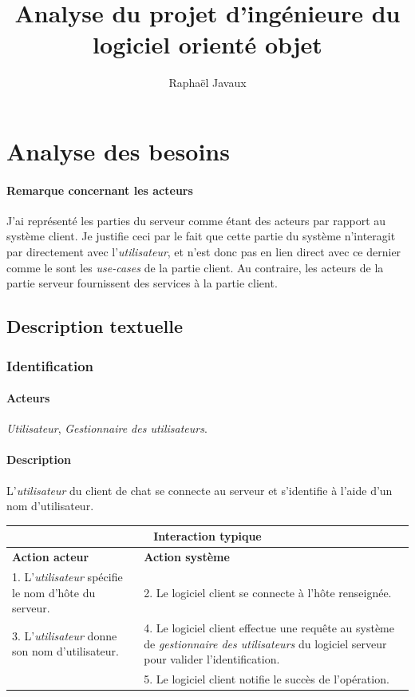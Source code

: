 \documentclass[a4paper]{article}
\title{Analyse du projet d’ingénieure du logiciel orienté objet}
\author{Raphaël Javaux}
\date{}
\begin{document}
\maketitle

 \section{Analyse des besoins}

    \paragraph{Remarque concernant les acteurs} J'ai représenté les parties
du serveur comme étant des acteurs par rapport au système client.
Je justifie ceci par le fait que cette partie du système n’interagit par
directement avec l'\textit{utilisateur}, et n'est donc pas en lien direct avec
ce dernier comme le sont les \textit{use-cases} de la partie client.
Au contraire, les acteurs de la partie serveur fournissent des services à
la partie client.

  \subsection{Description textuelle}

   \subsubsection{Identification}
    \paragraph{Acteurs} \textit{Utilisateur}, 
    \textit{Gestionnaire des utilisateurs}.

    \paragraph{Description} L'\textit{utilisateur} du client de chat se connecte
    au serveur et s'identifie à l'aide d'un nom d'utilisateur.

    \begin{center}
        \begin{tabular}{|p{6cm}|p{6cm}|}
            \hline
            \multicolumn{2}{|c|}{\textbf{Interaction typique}} \\ \hline
            \textbf{Action acteur} & \textbf{Action système} \\ \hline
            1. L'\textit{utilisateur} spécifie le nom d'hôte du serveur. & 
            2. Le logiciel client se connecte à l'hôte renseignée. \\
            3. L'\textit{utilisateur} donne son nom d'utilisateur. &
            4. Le logiciel client effectue une requête au système de
            \textit{gestionnaire des utilisateurs} du logiciel serveur pour
            valider l'identification. \\
            & 5. Le logiciel client notifie le succès de l'opération. \\
            \hline
        \end{tabular}
    \end{center}
\end{document}
